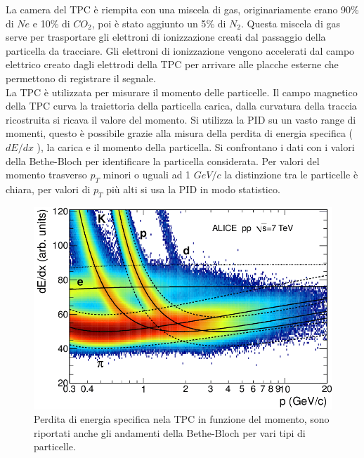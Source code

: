     La camera del TPC è riempita con una miscela di gas, originariamente erano 90$\%$ di $Ne$ e 10$\%$ di $CO_2$, poi è stato aggiunto un 5$\%$ di $N_2$. Questa miscela di gas serve per trasportare gli elettroni di ionizzazione creati dal passaggio della particella da tracciare. Gli elettroni di ionizzazione vengono accelerati dal campo elettrico creato dagli elettrodi della TPC per arrivare alle placche esterne che permettono di registrare il segnale. \cite{Collaboration_2008_ALICE}
    \\La TPC è utilizzata per misurare il momento delle particelle. Il campo magnetico della TPC curva la traiettoria della particella carica, dalla curvatura della traccia ricostruita si ricava il valore del momento. Si utilizza la PID su un vasto range di momenti, questo è possibile grazie alla misura della perdita di energia specifica ( $dE/dx$ ), la carica e il momento della particella. Si confrontano i dati con i valori della Bethe-Bloch per identificare la particella considerata. Per valori del momento trasverso $p_T$ minori o uguali ad 1 $GeV/c$  la distinzione tra le particelle è chiara, per valori di $p_T$ più alti si usa la PID in modo statistico. 
    
    \begin{figure}[htbp]
        \centering
        \includegraphics[width=0.6\linewidth]{ALICE/Specific-energy-loss-in-the-TPC.png}
        \caption{ Perdita di energia specifica nela TPC in funzione del momento, sono riportati anche gli andamenti della Bethe-Bloch per vari tipi di particelle.}
        \label{fig:BBnellaTPC}
    \end{figure}
    
    
    
    
    
    